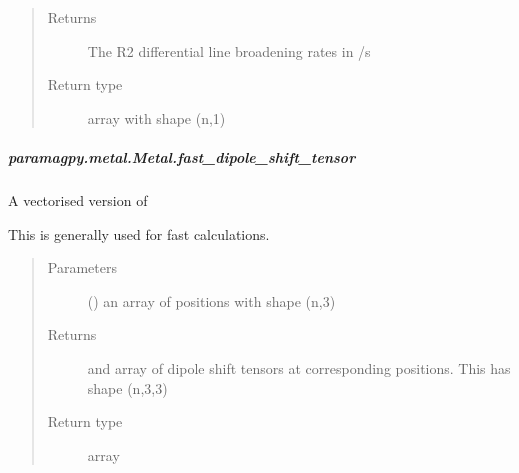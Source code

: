\documentclass[a4paper,10pt,english,openany,oneside]{sphinxmanual}
\begin{document}
\begin{fulllineitems}
\begin{fulllineitems}
\begin{fulllineitems}
\begin{quote}
\begin{description}
\item[{Returns}] \leavevmode
{} \textendash{} The R2 differential line broadening rates in /s

\item[{Return type}] \leavevmode
array with shape (n,1)

\end{description}\end{quote}

\end{fulllineitems}



\subparagraph{paramagpy.metal.Metal.fast\_dipole\_shift\_tensor}
\label{\detokenize{reference/generated/paramagpy.metal.Metal.fast_dipole_shift_tensor:paramagpy-metal-metal-fast-dipole-shift-tensor}}\label{\detokenize{reference/generated/paramagpy.metal.Metal.fast_dipole_shift_tensor::doc}}

\begin{fulllineitems}
\label{\detokenize{reference/generated/paramagpy.metal.Metal.fast_dipole_shift_tensor:paramagpy.metal.Metal.fast_dipole_shift_tensor}}
A vectorised version of
{\hyperref[\detokenize{reference/generated/paramagpy.metal.Metal.dipole_shift_tensor:paramagpy.metal.Metal.dipole_shift_tensor}]{}}

This is generally used for fast calculations.
\begin{quote}\begin{description}
\item[{Parameters}] \leavevmode
{} () \textendash{} an array of positions with shape (n,3)

\item[{Returns}] \leavevmode
{} \textendash{} and array of dipole shift tensors at corresponding positions.
This has shape (n,3,3)

\item[{Return type}] \leavevmode
array

\end{description}\end{quote}


\end{fulllineitems}
\end{fulllineitems}
\end{fulllineitems}
\end{document}

